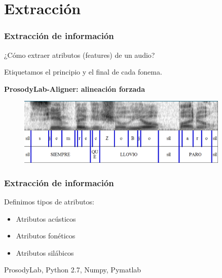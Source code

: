 \documentclass[mathserif]{beamer}%
\begin{document}
\section{Extracción}

\begin{frame}
	\frametitle{Extracción de información}
	
	¿Cómo extraer atributos (features) de un audio?
	
	Etiquetamos el principio y el final de cada fonema.
	
	\begin{center}
			\textbf{ProsodyLab-Aligner: alineación forzada}
	\end{center}
	
	\begin{figure}[h!]
		\centerline{\includegraphics[width=0.9\textwidth]{frase-espectrograma-cortado2} }
	\end{figure}
\end{frame}

\begin{frame}
	\frametitle{Extracción de información}
	Definimos tipos de atributos:
	\begin{itemize}\itemsep=2ex
		\item Atributos acústicos
		\item Atributos fonéticos
		\item Atributos silábicos
	\end{itemize}
	{\tiny ProsodyLab, Python 2.7, Numpy, Pymatlab}
	
\end{frame}

%		
%	
\end{document}
